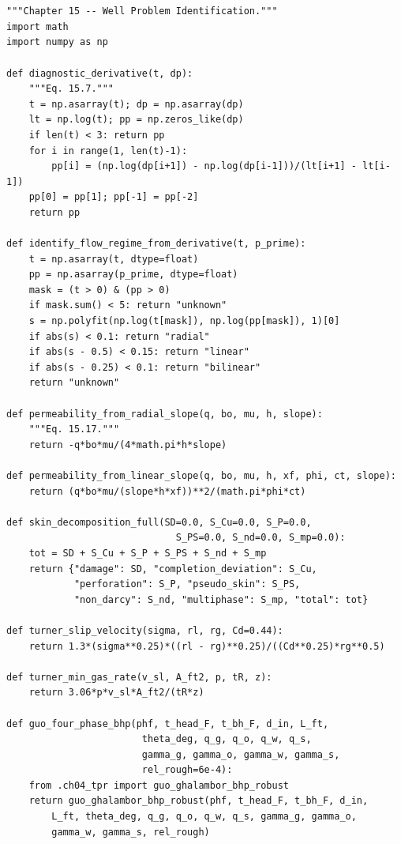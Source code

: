 \documentclass[10pt,a4paper,openany]{book}
\begin{document}
\chapter{}
\begin{lstlisting}
"""Chapter 15 -- Well Problem Identification."""
import math
import numpy as np

def diagnostic_derivative(t, dp):
    """Eq. 15.7."""
    t = np.asarray(t); dp = np.asarray(dp)
    lt = np.log(t); pp = np.zeros_like(dp)
    if len(t) < 3: return pp
    for i in range(1, len(t)-1):
        pp[i] = (np.log(dp[i+1]) - np.log(dp[i-1]))/(lt[i+1] - lt[i-1])
    pp[0] = pp[1]; pp[-1] = pp[-2]
    return pp

def identify_flow_regime_from_derivative(t, p_prime):
    t = np.asarray(t, dtype=float)
    pp = np.asarray(p_prime, dtype=float)
    mask = (t > 0) & (pp > 0)
    if mask.sum() < 5: return "unknown"
    s = np.polyfit(np.log(t[mask]), np.log(pp[mask]), 1)[0]
    if abs(s) < 0.1: return "radial"
    if abs(s - 0.5) < 0.15: return "linear"
    if abs(s - 0.25) < 0.1: return "bilinear"
    return "unknown"

def permeability_from_radial_slope(q, bo, mu, h, slope):
    """Eq. 15.17."""
    return -q*bo*mu/(4*math.pi*h*slope)

def permeability_from_linear_slope(q, bo, mu, h, xf, phi, ct, slope):
    return (q*bo*mu/(slope*h*xf))**2/(math.pi*phi*ct)

def skin_decomposition_full(SD=0.0, S_Cu=0.0, S_P=0.0,
                              S_PS=0.0, S_nd=0.0, S_mp=0.0):
    tot = SD + S_Cu + S_P + S_PS + S_nd + S_mp
    return {"damage": SD, "completion_deviation": S_Cu,
            "perforation": S_P, "pseudo_skin": S_PS,
            "non_darcy": S_nd, "multiphase": S_mp, "total": tot}

def turner_slip_velocity(sigma, rl, rg, Cd=0.44):
    return 1.3*(sigma**0.25)*((rl - rg)**0.25)/((Cd**0.25)*rg**0.5)

def turner_min_gas_rate(v_sl, A_ft2, p, tR, z):
    return 3.06*p*v_sl*A_ft2/(tR*z)

def guo_four_phase_bhp(phf, t_head_F, t_bh_F, d_in, L_ft,
                        theta_deg, q_g, q_o, q_w, q_s,
                        gamma_g, gamma_o, gamma_w, gamma_s,
                        rel_rough=6e-4):
    from .ch04_tpr import guo_ghalambor_bhp_robust
    return guo_ghalambor_bhp_robust(phf, t_head_F, t_bh_F, d_in,
        L_ft, theta_deg, q_g, q_o, q_w, q_s, gamma_g, gamma_o,
        gamma_w, gamma_s, rel_rough)


\end{lstlisting}
\end{document}
